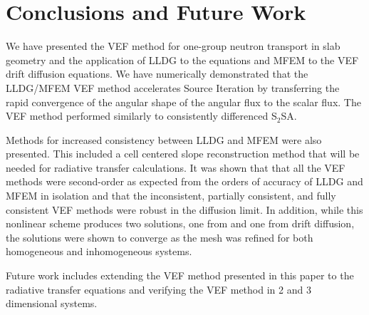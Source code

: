 
\section{Conclusions and Future Work}
We have presented the VEF method for one-group neutron transport in slab geometry and the application of LLDG to the \SN equations and MFEM to the VEF drift diffusion equations. We have numerically demonstrated that the LLDG/MFEM VEF method accelerates Source Iteration by transferring the rapid convergence of the angular shape of the angular flux to the scalar flux. The VEF method performed similarly to consistently differenced S$_2$SA. 

Methods for increased consistency between LLDG and MFEM were also presented. This included a cell centered slope reconstruction method that will be needed for radiative transfer calculations. It was shown that that all the VEF methods were second-order as expected from the orders of accuracy of LLDG and MFEM in isolation and that the inconsistent, partially consistent, and fully consistent VEF methods were robust in the diffusion limit. In addition, while this nonlinear scheme produces two solutions, one from \SN and one from drift diffusion, the solutions were shown to converge as the mesh was refined for both homogeneous and inhomogeneous systems. 

Future work includes extending the VEF method presented in this paper to the radiative transfer equations and verifying the VEF method in 2 and 3 dimensional systems. 